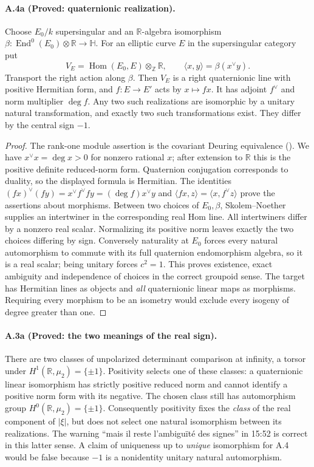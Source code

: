 \paragraph{A.4a (Proved: quaternionic realization).}
Choose $E_0/k$ supersingular and an $\mathbb R$-algebra isomorphism
$\beta:\operatorname{End}^0(E_0)\otimes\mathbb R\to\mathbb H$.
For an elliptic curve $E$ in the supersingular category put
\[
 V_E=\operatorname{Hom}(E_0,E)\otimes_{\mathbb Z}\mathbb R,
 \qquad \langle x,y\rangle=\beta(x^\vee y).
\]
Transport the right action along $\beta$. Then $V_E$ is a right
quaternionic line with positive Hermitian form, and
$f:E\to E'$ acts by $x\mapsto fx$. It has adjoint $f^\vee$ and
norm multiplier $\deg f$. Any two such realizations are isomorphic
by a unitary natural transformation, and exactly two such
transformations exist. They differ by the central sign $-1$.

\begin{proof}
The rank-one module assertion is the covariant Deuring equivalence
(\citealp[Theorem 42.3.2 and Remark 42.3.3]{Voight2021}).
We have $x^\vee x=\deg x>0$ for nonzero rational $x$; after extension
to $\mathbb R$ this is the positive definite reduced-norm form.
Quaternion conjugation corresponds to duality, so the displayed
formula is Hermitian. The identities
$(fx)^\vee(fy)=x^\vee f^\vee f y=(\deg f)x^\vee y$ and
$\langle fx,z\rangle=\langle x,f^\vee z\rangle$ prove the assertions
about morphisms.
Between two choices of $E_0,\beta$, Skolem--Noether supplies an
intertwiner in the corresponding real Hom line. All intertwiners
differ by a nonzero real scalar. Normalizing its positive norm leaves
exactly the two choices differing by sign. Conversely naturality at
$E_0$ forces every natural automorphism to commute with its full
quaternion endomorphism algebra, so it is a real scalar; being unitary
forces $c^2=1$. This proves existence, exact ambiguity and independence
of choices in the correct groupoid sense.
The target has Hermitian lines as objects and \emph{all} quaternionic
linear maps as morphisms. Requiring every morphism to be an isometry
would exclude every isogeny of degree greater than one.
\end{proof}

\paragraph{A.3a (Proved: the two meanings of the real sign).}
There are two classes of unpolarized determinant comparison at infinity,
a torsor under $H^1(\mathbb R,\mu_2)=\{\pm1\}$.
Positivity selects one of these classes: a quaternionic linear
isomorphism has strictly positive reduced norm and cannot identify
a positive norm form with its negative. The chosen class still has
automorphism group $H^0(\mathbb R,\mu_2)=\{\pm1\}$.
Consequently positivity fixes the \emph{class} of the real component
of $|\xi|$, but does not select one natural isomorphism between its
realizations. The warning ``mais il reste l'ambiguïté des signes''
in 15:52 is correct in this latter sense. A claim of uniqueness up to
\emph{unique} isomorphism for A.4 would be false because $-1$ is a
nonidentity unitary natural automorphism.

